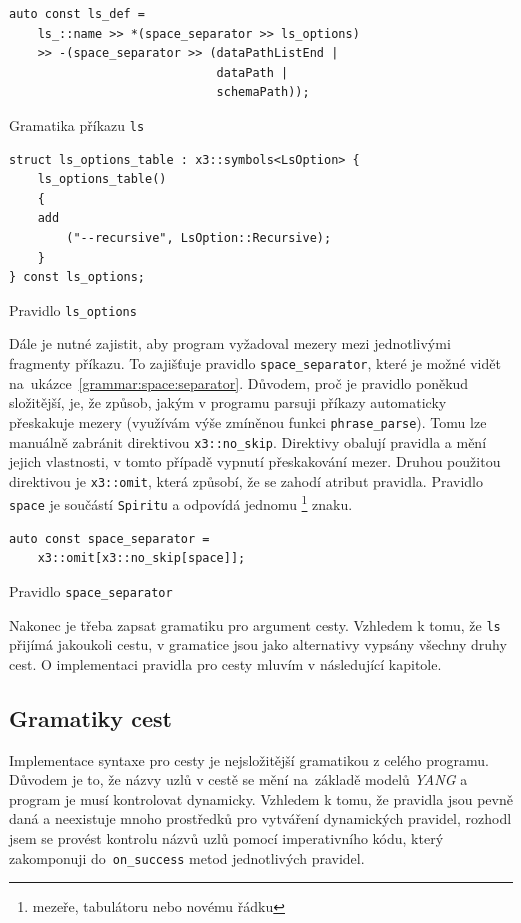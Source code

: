 \documentclass[thesis=B,czech,hidelinks]{FITthesis}[2019/03/06]
\begin{document}
\begin{listing}
\begin{verbatim}
auto const ls_def =
    ls_::name >> *(space_separator >> ls_options)
    >> -(space_separator >> (dataPathListEnd |
                             dataPath |
                             schemaPath));
\end{verbatim}
\caption{Gramatika příkazu \texttt{ls}}\label{grammar:ls}
\end{listing}


\begin{listing}
\begin{verbatim}
struct ls_options_table : x3::symbols<LsOption> {
    ls_options_table()
    {
    add
        ("--recursive", LsOption::Recursive);
    }
} const ls_options;
\end{verbatim}
\caption{Pravidlo \texttt{ls\_options}}\label{grammar:ls:options}
\end{listing}

Dále je nutné zajistit, aby program vyžadoval mezery mezi jednotlivými fragmenty příkazu. To zajišťuje pravidlo \verb¨space_separator¨, které je možné vidět na~ukázce~\ref{grammar:space:separator}. Důvodem, proč je pravidlo poněkud složitější, je, že způsob, jakým v programu parsuji příkazy automaticky přeskakuje mezery (využívám výše zmíněnou funkci \texttt{phrase\_parse}). Tomu lze manuálně zabránit direktivou \verb¨x3::no_skip¨. Direktivy obalují pravidla a mění jejich vlastnosti, v tomto případě vypnutí přeskakování mezer. Druhou použitou direktivou je \verb¨x3::omit¨, která způsobí, že se zahodí atribut pravidla. Pravidlo \texttt{space} je součástí \texttt{Spiritu} a odpovídá jednomu \footnote{mezeře, tabulátoru nebo novému řádku} znaku.

\begin{listing}
\begin{verbatim}
auto const space_separator =
    x3::omit[x3::no_skip[space]];
\end{verbatim}
\caption{Pravidlo \texttt{space\_separator}}\label{grammar:space:separator}
\end{listing}

Nakonec je třeba zapsat gramatiku pro argument cesty. Vzhledem k tomu, že \texttt{ls} přijímá jakoukoli cestu, v gramatice jsou jako alternativy vypsány všechny druhy cest. O implementaci pravidla pro cesty mluvím v následující kapitole.

\subsection{Gramatiky cest}
Implementace syntaxe pro cesty je nejsložitější gramatikou z celého programu. Důvodem je to, že názvy uzlů v cestě se mění na~základě modelů \textit{YANG} a program je musí kontrolovat dynamicky. Vzhledem k tomu, že pravidla jsou pevně daná a neexistuje mnoho prostředků pro vytváření dynamických pravidel, rozhodl jsem se provést kontrolu názvů uzlů pomocí imperativního kódu, který zakomponuji do~\verb¨on_success¨ metod jednotlivých pravidel.
\end{document}
